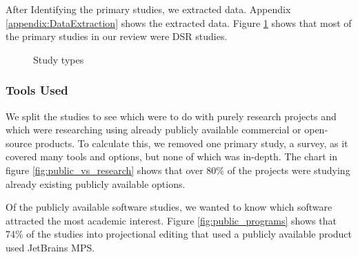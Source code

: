 After Identifying the primary studies, we extracted data.
Appendix \ref{appendix:DataExtraction} shows the extracted data.
Figure \ref{fig:study_types} shows that most of the primary studies in our review were DSR studies.

\begin{figure}[h]
    \centering
    \caption{Study types}
    \label{fig:study_types}
\end{figure}

\subsubsection{Tools Used}

We split the studies to see which were to do with purely research projects and which were researching using already publicly available commercial or open-source products.
To calculate this, we removed one primary study, a survey, as it covered many tools and options, but none of which was in-depth.
The chart in figure \ref{fig:public_vs_research} shows that over 80\% of the projects were studying already existing publicly available options.

Of the publicly available software studies, we wanted to know which software attracted the most academic interest.
Figure \ref{fig:public_programs} shows that 74\% of the studies into projectional editing that used a publicly available product used JetBrains MPS.

